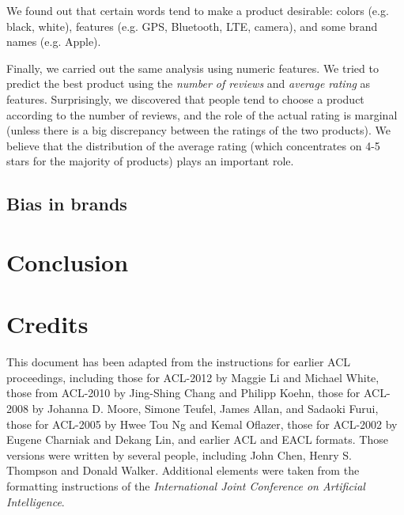 \documentclass[11pt]{article}
\begin{document}
We found out that certain words tend to make a product desirable: colors (e.g. black, white), features (e.g. GPS, Bluetooth, LTE, camera), and some brand names (e.g. Apple).

Finally, we carried out the same analysis using numeric features. We tried to predict the best product using the \emph{number of reviews} and \emph{average rating} as features. Surprisingly, we discovered that people tend to choose a product according to the number of reviews, and the role of the actual rating is marginal (unless there is a big discrepancy between the ratings of the two products). We believe that the distribution of the average rating (which concentrates on 4-5 stars for the majority of products) plays an important role.


\subsection{Bias in brands}

\section{Conclusion}
\label{sec:conclusion}



\clearpage
\newpage



\section{Credits}

This document has been adapted from the instructions for earlier ACL
proceedings, including those for ACL-2012 by Maggie Li and Michael
White, those from ACL-2010 by Jing-Shing Chang and Philipp Koehn,
those for ACL-2008 by Johanna D. Moore, Simone Teufel, James Allan,
and Sadaoki Furui, those for ACL-2005 by Hwee Tou Ng and Kemal
Oflazer, those for ACL-2002 by Eugene Charniak and Dekang Lin, and
earlier ACL and EACL formats. Those versions were written by several
people, including John Chen, Henry S. Thompson and Donald
Walker. Additional elements were taken from the formatting
instructions of the {\em International Joint Conference on Artificial
  Intelligence}.
\end{document}
